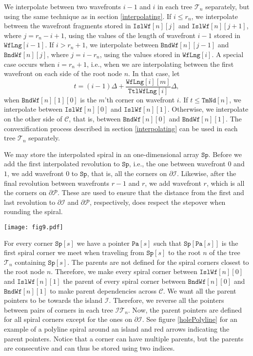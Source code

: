 \documentclass[3p]{elsarticle}
\newcommand{\VD}{\mathcal{VD}}
\newcommand{\PP}{\mathcal{P}}
\newcommand{\HH}{\mathcal{I}}
\newcommand{\CC}{\mathcal{C}}
\newcommand{\TT}{\mathcal{T}}
\newcommand{\HT}{\HH\TT}
\newcommand{\tStepover}{\Delta}
\newcommand{\ttimeO}{\texttt{TmNd}}
\newcommand{\wavefront}{\texttt{Wf}}
\newcommand{\holeWavefront}{\texttt{Isl}\wavefront}
\newcommand{\boundaryWavefront}{\texttt{Bnd}\wavefront}
\newcommand{\wavefrontLength}{\wavefront\texttt{Lng}}
\newcommand{\totalWavefrontLength}{\texttt{Ttl}\wavefrontLength}
\newcommand{\spiral}{\texttt{Sp}}
\newcommand{\parent}{\texttt{Pa}}
\begin{document}
We interpolate between two wavefronts $i-1$ and $i$ in each tree $\TT_{n}$ separately,
but using the same technique as in section \ref{interpolating}. If
$i\leq r_{n}$, we interpolate between the
wavefront fragments stored in
$\holeWavefront[n][j]$ and $\holeWavefront[n][j+1]$,
where $j=r_{n}-i+1$, using the values of the length of wavefront $i-1$ stored in
$\wavefrontLength[i-1]$.
If $i>r_{n}+1$, we interpolate between
$\boundaryWavefront[n][j-1]$ and $\boundaryWavefront[n][j]$,
where $j=i-r_{n}$, using the values stored in $\wavefrontLength[i]$.
A special case occurs when
$i=r_{n}+1$, i.e.,
when we are interpolating between the first wavefront on each side of the root node $n$.
In that case, let
$$t=(i-1)\tStepover + \frac{\wavefrontLength[i][m]}{\totalWavefrontLength[i]}\tStepover,$$
when $\boundaryWavefront[n][1][0]$ is the $m$'th corner on wavefront $i$.
If $t\leq \ttimeO[n]$, we interpolate between $\holeWavefront[n][0]$ and $\holeWavefront[n][1]$.
Otherwise, we interpolate on the other side of $\CC$, that is,
between $\boundaryWavefront[n][0]$ and $\boundaryWavefront[n][1]$.
The convexification process described in section \ref{interpolating} can be used in each
tree $\TT_n$ separately.

We may store the interpolated spiral in an one-dimensional array $\spiral$.
Before we add the first interpolated revolution to $\spiral$, i.e., the one between wavefront $0$ and $1$,
we add wavefront $0$ to $\spiral$, that is, all the corners on $\partial\HH$. Likewise,
after the final revolution between wavefronts $r-1$ and $r$, we add wavefront $r$, which is
all the corners on $\partial\PP$. These are used to ensure that the distance from the
first and last revolution to $\partial\HH$ and $\partial\PP$, respectively,
does respect the stepover when rounding the spiral.

\begin{figure*}
\centering
\texttt{[image: fig9.pdf]}
\caption{
A polyline spiral in black and red arrows from each corner $\spiral[s]$ to its parents.
The cycle $\CC$ is in blue and the diagram $\VD$ is in gray.
}
\label{holePolyline}
\end{figure*}

For every corner $\spiral[s]$ we have a pointer $\parent[s]$ such that $\spiral[\parent[s]]$ is
the first spiral corner we meet when traveling from $\spiral[s]$ to the root $n$ of the tree $\TT_n$
containing $\spiral[s]$.
The parents are not defined for the spiral corners closest to the root node $n$.
Therefore, we make every spiral corner between $\holeWavefront[n][0]$ and
$\holeWavefront[n][1]$
the parent of every spiral corner between $\boundaryWavefront[n][0]$ and $\boundaryWavefront[n][1]$
to make parent dependencies across $\CC$.
We want all the parent pointers to be towards the island $\HH$. Therefore, we reverse
all the pointers between pairs of corners in each tree $\HT_n$. Now, the parent pointers
are defined for all spiral corners except for the ones on $\partial\HH$.
See figure \ref{holePolyline} for an example of a polyline spiral around an island and red arrows
indicating the parent pointers. Notice that a corner can have multiple parents, but the parents
are consecutive and can thus be stored using two indices.
\end{document}
